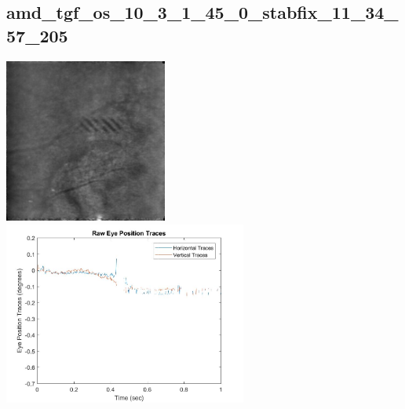 \documentclass[11pt]{article}
\begin{document}
\subsection{amd\_tgf\_os\_10\_3\_1\_45\_0\_stabfix\_11\_34\_57\_205}
\includegraphics[width=0.40\textwidth, valign=m]{referenceframes/tslo_amd/amd_tgf_os_10_3_1_45_0_stabfix_11_34_57_205_dwt_nostim_gamscaled_bandfilt_refframe.jpg}
\includegraphics[width=0.60\textwidth, valign=m]{eyepositiontraces/tslo_amd/amd_tgf_os_10_3_1_45_0_stabfix_11_34_57_205.jpg}\\
\end{document}
